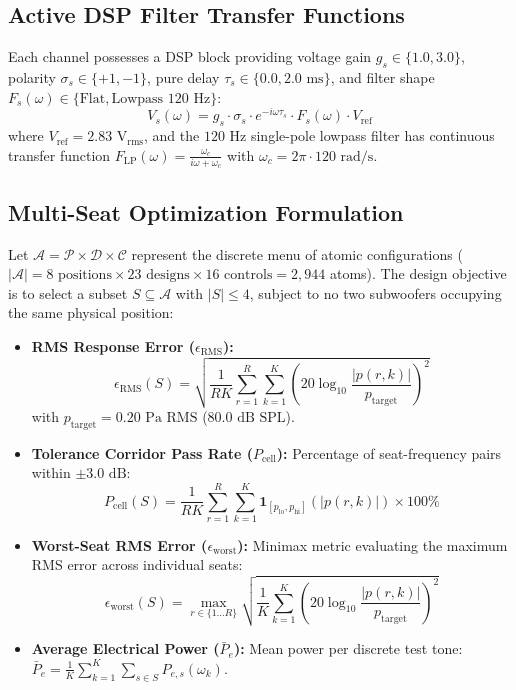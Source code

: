 \documentclass[11pt,a4paper]{article}
\begin{document}
\subsection{Active DSP Filter Transfer Functions}
Each channel possesses a DSP block providing voltage gain $g_s \in \{1.0, 3.0\}$, polarity $\sigma_s \in \{+1, -1\}$, pure delay $\tau_s \in \{0.0, 2.0\text{ ms}\}$, and filter shape $F_s(\omega) \in \{\text{Flat}, \text{Lowpass } 120\text{ Hz}\}$:
\begin{equation}
    V_s(\omega) = g_s \cdot \sigma_s \cdot e^{-i \omega \tau_s} \cdot F_s(\omega) \cdot V_{\text{ref}}
\end{equation}
where $V_{\text{ref}} = 2.83\text{ V}_{\text{rms}}$, and the $120\text{ Hz}$ single-pole lowpass filter has continuous transfer function $F_{\text{LP}}(\omega) = \frac{\omega_c}{i \omega + \omega_c}$ with $\omega_c = 2 \pi \cdot 120\text{ rad/s}$.

\subsection{Multi-Seat Optimization Formulation}
Let $\mathcal{A} = \mathcal{P} \times \mathcal{D} \times \mathcal{C}$ represent the discrete menu of atomic configurations ($|\mathcal{A}| = 8 \text{ positions} \times 23 \text{ designs} \times 16 \text{ controls} = 2,944$ atoms). The design objective is to select a subset $S \subseteq \mathcal{A}$ with $|S| \le 4$, subject to no two subwoofers occupying the same physical position:
\begin{itemize}
    \item \textbf{RMS Response Error ($\epsilon_{\text{RMS}}$):}
    \begin{equation}
        \epsilon_{\text{RMS}}(S) = \sqrt{\frac{1}{R K} \sum_{r=1}^R \sum_{k=1}^K \left( 20 \log_{10} \frac{|p(r, k)|}{p_{\text{target}}} \right)^2}
    \end{equation}
    with $p_{\text{target}} = 0.20\text{ Pa RMS}$ ($80.0\text{ dB SPL}$).
    \item \textbf{Tolerance Corridor Pass Rate ($P_{\text{cell}}$):} Percentage of seat-frequency pairs within $\pm 3.0\text{ dB}$:
    \begin{equation}
        P_{\text{cell}}(S) = \frac{1}{R K} \sum_{r=1}^R \sum_{k=1}^K \mathbf{1}_{\left[ p_{\text{lo}}, p_{\text{hi}} \right]}(|p(r, k)|) \times 100\%
    \end{equation}
    \item \textbf{Worst-Seat RMS Error ($\epsilon_{\text{worst}}$):} Minimax metric evaluating the maximum RMS error across individual seats:
    \begin{equation}
        \epsilon_{\text{worst}}(S) = \max_{r \in \{1 \dots R\}} \sqrt{\frac{1}{K} \sum_{k=1}^K \left( 20 \log_{10} \frac{|p(r, k)|}{p_{\text{target}}} \right)^2}
    \end{equation}
    \item \textbf{Average Electrical Power ($\bar{P}_e$):} Mean power per discrete test tone: $\bar{P}_e = \frac{1}{K} \sum_{k=1}^K \sum_{s \in S} P_{e, s}(\omega_k)$.
\end{itemize}
\end{document}
